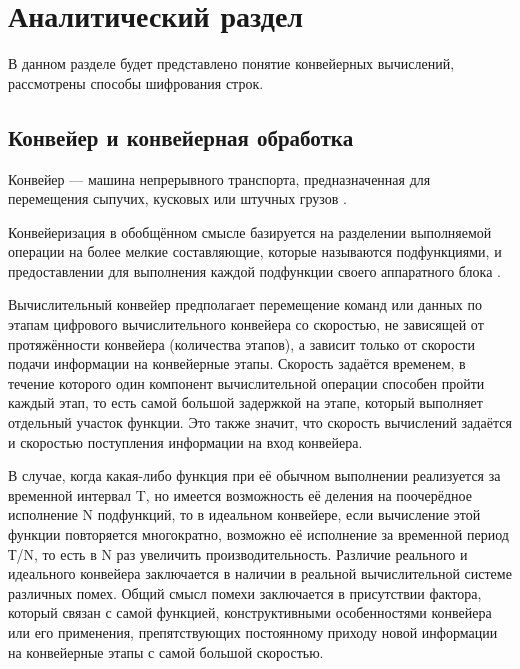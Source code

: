 \chapter{Аналитический раздел}
\label{cha:analysis}
В данном разделе будет представлено понятие конвейерных вычислений, рассмотрены способы шифрования строк.

\section{Конвейер и конвейерная обработка}
\label{sec:conv}
Конвейер — машина непрерывного транспорта, предназначенная для перемещения сыпучих, кусковых или штучных грузов \cite{conveyorbelt}.
\par Конвейеризация в обобщённом смысле базируется на разделении выполняемой операции на более мелкие составляющие, которые называются подфункциями, и предоставлении для выполнения каждой подфункции своего аппаратного блока \cite{conveyor}.

\par Вычислительный конвейер предполагает перемещение команд или данных по этапам цифрового вычислительного конвейера со скоростью, не зависящей от протяжённости конвейера (количества этапов), а зависит только от скорости подачи информации на конвейерные этапы. Скорость задаётся временем, в течение которого один компонент вычислительной операции способен пройти каждый этап, то есть самой большой задержкой на этапе, который выполняет отдельный участок функции. Это также значит, что скорость вычислений задаётся и скоростью поступления информации на вход конвейера. 
\par В случае, когда какая-либо функция при её обычном выполнении реализуется за временной интервал T, но имеется возможность её деления на поочерёдное исполнение N подфункций, то в идеальном конвейере, если вычисление этой функции повторяется многократно, возможно её исполнение за временной период Т/N, то есть в N раз увеличить производительность. Различие реального и идеального конвейера заключается в наличии в реальной вычислительной системе различных помех. Общий смысл помехи заключается в присутствии фактора, который связан с самой функцией, конструктивными особенностями конвейера или его применения, препятствующих постоянному приходу новой информации на конвейерные этапы с самой большой скоростью.

